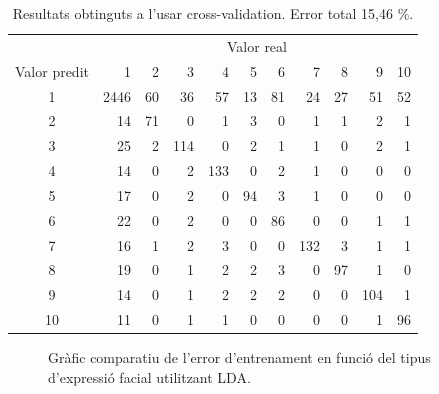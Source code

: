 \documentclass[a4paper]{article}
\begin{document}
\begin{table}[H]
	\centering
	\def\arraystretch{1.2}
	\begin{tabular}{|c|rrrrrrrrrr|}
		\hline
		& \multicolumn{10}{c|}{Valor real} \\
		Valor predit & 1 & 2 & 3 & 4 & 5 & 6 & 7 & 8 & 9 & 10 \\
		\hline
		1 & 2446 & 60 & 36 & 57 & 13 & 81 & 24 & 27 & 51 & 52 \\
		2 & 14 & 71 & 0 & 1 & 3 & 0 & 1 & 1 & 2 & 1 \\
		3 & 25 & 2 & 114 & 0 & 2 & 1 & 1 & 0 & 2 & 1 \\
		4 & 14 & 0 & 2 & 133 & 0 & 2 & 1 & 0 & 0 & 0 \\
		5 & 17 & 0 & 2 & 0 & 94 & 3 & 1 & 0 & 0 & 0 \\
		6 & 22 & 0 & 2 & 0 & 0 & 86 & 0 & 0 & 1 & 1 \\
		7 & 16 & 1 & 2 & 3 & 0 & 0 & 132 & 3 & 1 & 1 \\
		8 & 19 & 0 & 1 & 2 & 2 & 3 & 0 & 97 & 1 & 0 \\
		9 & 14 & 0 & 1 & 2 & 2 & 2 & 0 & 0 & 104 & 1 \\
		10 & 11 & 0 & 1 & 1 & 0 & 0 & 0 & 0 & 1 & 96 \\
		\hline
	\end{tabular}
	\caption{Resultats obtinguts a l'usar cross-validation. Error total 15,46 \%.}
\end{table}


\begin{figure}[H]
	\centering
	\captionsetup{width=0.8\textwidth}
	\caption{Gràfic comparatiu de l'error d'entrenament en funció del tipus d'expressió facial utilitzant LDA.}
\end{figure}
\end{document}
